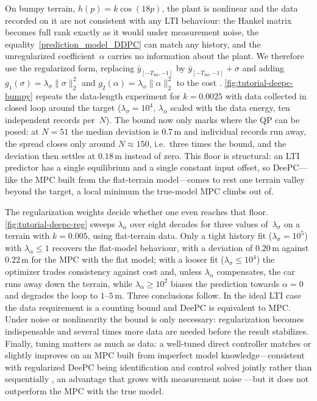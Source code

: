 \begin{tutorialexample}[label={ex:deepc}]
  On bumpy terrain, $h(p)=k\cos(18p)$, the plant is nonlinear and the data recorded on it are not consistent with any \ac{LTI} behaviour: the Hankel matrix becomes full rank exactly as it would under measurement noise, the equality~\eqref{prediction_model_DDPC} can match any history, and the unregularized coefficient~$\alpha$ carries no information about the plant. We therefore use the regularized form, replacing $\bar y_{[-T_\mathrm{ini},-1]}$ by $\bar y_{[-T_\mathrm{ini},-1]}+\sigma$ and adding $g_1(\sigma)=\lambda_\sigma\|\sigma\|_2^2$ and $g_2(\alpha)=\lambda_\alpha\|\alpha\|_2^2$ to the cost \cite{CoulsonLygDoe2019,BerberichKoeMueAll2021}. \autoref{fig:tutorial-deepc-bumpy} repeats the data-length experiment for $k=0.0025$ with data collected in closed loop around the target ($\lambda_\sigma=10^4$, $\lambda_\alpha$ scaled with the data energy, ten independent records per~$N$). The bound now only marks where the \ac{QP} can be posed: at $N=51$ the median deviation is $0.7\,\mathrm{m}$ and individual records run away, the spread closes only around $N\approx150$, i.e.\ three times the bound, and the deviation then settles at $0.18\,\mathrm{m}$ instead of zero. This floor is structural: an \ac{LTI} predictor has a single equilibrium and a single constant input offset, so DeePC---like the \ac{MPC} built from the flat-terrain model---comes to rest one terrain valley beyond the target, a local minimum the true-model \ac{MPC} climbs out of.

  The regularization weights decide whether one even reaches that floor. \autoref{fig:tutorial-deepc-reg} sweeps $\lambda_\alpha$ over eight decades for three values of~$\lambda_\sigma$ on a terrain with $k=0.005$, using flat-terrain data. Only a tight history fit ($\lambda_\sigma=10^5$) with $\lambda_\alpha\le1$ recovers the flat-model behaviour, with a deviation of $0.20\,\mathrm{m}$ against $0.22\,\mathrm{m}$ for the \ac{MPC} with the flat model; with a looser fit ($\lambda_\sigma\le10^4$) the optimizer trades consistency against cost and, unless $\lambda_\alpha$ compensates, the car runs away down the terrain, while $\lambda_\alpha\ge10^2$ biases the prediction towards $\alpha=0$ and degrades the loop to $1$--$5\,\mathrm{m}$. Three conclusions follow. In the ideal \ac{LTI} case the data requirement is a counting bound and DeePC is equivalent to \ac{MPC}. Under noise or nonlinearity the bound is only necessary: regularization becomes indispensable and several times more data are needed before the result stabilizes. Finally, tuning matters as much as data: a well-tuned direct controller matches or slightly improves on an \ac{MPC} built from imperfect model knowledge---consistent with regularized DeePC being identification and control solved jointly rather than sequentially \cite{DorflerCoulMarTAC23}, an advantage that grows with measurement noise \cite[Ex.~9.8]{cfr-nootbook}---but it does not outperform the \ac{MPC} with the true model.


\end{tutorialexample}
